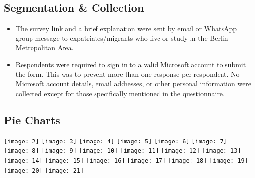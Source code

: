 \vspace{1.5em}

\subsection*{Segmentation \& Collection}
\begin{itemize}
  \item The survey link and a brief explanation were sent by email or WhatsApp group message to expatriates/migrants who live or study in the Berlin Metropolitan Area.
  \item Respondents were required to sign in to a valid Microsoft account to submit the form. This was to prevent more than one response per respondent. No Microsoft account details, email addresses, or other personal information were collected except for those specifically mentioned in the questionnaire.
\end{itemize}

\subsection*{Pie Charts} \vspace{1.5em}
\noindent \centering
\graphicspath{ {./attachments/appA} }
\texttt{[image: 2]}
\texttt{[image: 3]}
\texttt{[image: 4]}
\texttt{[image: 5]}
\texttt{[image: 6]}
\texttt{[image: 7]}
\texttt{[image: 8]}
\texttt{[image: 9]}
\texttt{[image: 10]}
\texttt{[image: 11]}
\texttt{[image: 12]}
\texttt{[image: 13]}
\texttt{[image: 14]}
\texttt{[image: 15]}
\texttt{[image: 16]}
\texttt{[image: 17]}
\texttt{[image: 18]}
\texttt{[image: 19]}
\texttt{[image: 20]}
\texttt{[image: 21]}

\justifying
\clearpage